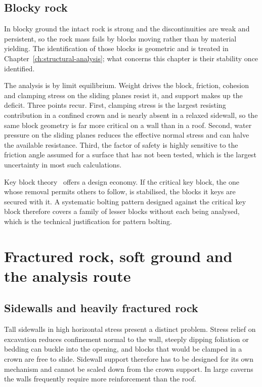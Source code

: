 \subsection{Blocky rock}
\label{sec:blocky-rock}

In blocky ground the intact rock is strong and the discontinuities are weak
and persistent, so the rock mass fails by blocks moving rather than by
material yielding. The identification of those blocks is geometric and is
treated in Chapter~\ref{ch:structural-analysis}; what concerns this chapter is
their stability once identified.

The analysis is by limit equilibrium. Weight drives the block, friction, cohesion and
clamping stress on the sliding planes resist it, and support makes up the deficit.
Three points recur. First, clamping stress is the largest resisting contribution in a
confined crown and is nearly absent in a relaxed sidewall, so the same block
geometry is far more critical on a wall than in a roof. Second, water pressure on the
sliding planes reduces the effective normal stress and can halve the available resistance.
Third, the factor of safety is highly sensitive to the friction angle assumed for
a surface that has not been tested, which is the largest uncertainty in most such
calculations.

Key block theory~\citep{goodman1985block} offers a design economy. If the critical key block, the
one whose removal permits others to follow, is stabilised, the blocks it
keys are secured with it. A systematic bolting pattern designed against the
critical key block therefore covers a family of lesser blocks without each
being analysed, which is the technical justification for pattern bolting.

\section{Fractured rock, soft ground and the analysis route}
\label{sec:weak-ground}

\subsection{Sidewalls and heavily fractured rock}
\label{sec:sidewalls-fractured}

Tall sidewalls in high horizontal stress present a distinct problem. Stress
relief on excavation reduces confinement normal to the wall, steeply dipping
foliation or bedding can buckle into the opening, and blocks that would be
clamped in a crown are free to slide. Sidewall support therefore has to be designed for its own mechanism
and cannot be scaled down from the crown support. In large caverns
the walls frequently require more reinforcement than the roof.

